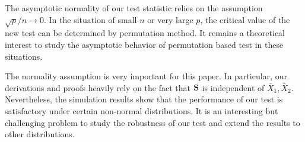 \documentclass[3p]{elsarticle}
\theoremstyle{plain}
\newtheorem{lemma}{\quad\quad Lemma}
\theoremstyle{definition}
\theoremstyle{remark}
\begin{document}
The asymptotic normality of our test statistic relies on the assumption $\sqrt{p}/n\to 0$. In the situation of small $n$ or very large $p$, the critical value of the new test can be determined by permutation method. It remains a theoretical interest to study the asymptotic behavior of permutation based test in these situations.

The normality assumption is very important for this paper.
In particular, our derivations and proofs heavily rely on the fact that $\mathbf{S}$ is independent of $\bar{X}_1,\bar{X}_2$.
Nevertheless, the simulation results show that the performance of our test is satisfactory under certain non-normal distributions.
It is an interesting but challenging problem to study the robustness of our test and extend the results to other distributions.





\end{document}
